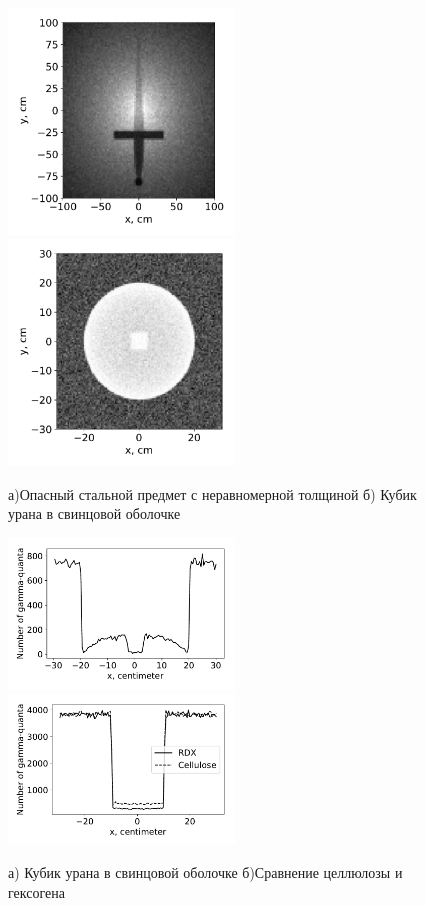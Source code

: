 \documentclass[a4paper]{panl}
\begin{document}
\begin{figure}[t]
    \begin{center}
        \includegraphics[width=60mm]{figures/Sword.pdf} 
        \includegraphics[width=60mm]{figures/UranCube1.pdf}  
        \vspace{-3mm}
        \caption{а)Опасный стальной предмет с неравномерной толщиной б) Кубик урана в свинцовой оболочке}
    \end{center}
    \vspace{-5mm}
\end{figure}
\begin{figure}[t]
    \begin{center}
        \includegraphics[width=60mm]{figures/UranCube2.pdf} 
        \includegraphics[width=60mm]{figures/Hex.pdf}  
        \vspace{-3mm}
        \caption{а) Кубик урана в свинцовой оболочке б)Сравнение целлюлозы и гексогена}
    \end{center}
    \vspace{-5mm}
\end{figure}
\end{document}
